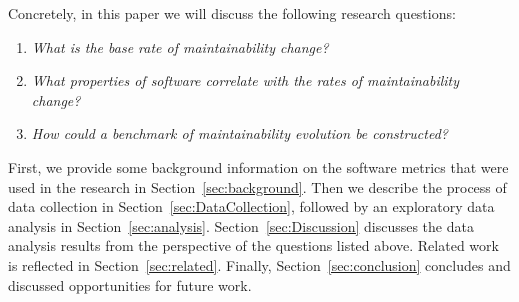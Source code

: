 Concretely, in this paper we will discuss the following research questions:
\begin{enumerate}
\item \textit{What is the base rate of maintainability change?}
\item \textit{What properties of software correlate with the rates of maintainability change?}
\item \textit{How could a benchmark of maintainability evolution be constructed?}
\end{enumerate}

First, we provide some background information on the software metrics that were used in the research in Section~\ref{sec:background}. Then we describe the process of data collection in Section~\ref{sec:DataCollection}, followed by an exploratory data analysis in Section~\ref{sec:analysis}. Section~\ref{sec:Discussion} discusses the data analysis results from the perspective of the questions listed above. Related work is reflected in Section~\ref{sec:related}. Finally, Section~\ref{sec:conclusion} concludes and discussed opportunities for future work.

